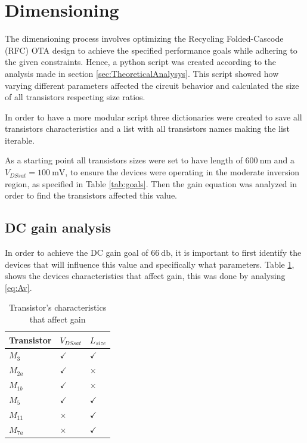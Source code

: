 \section{Dimensioning}

The dimensioning process involves optimizing the Recycling Folded-Cascode (RFC) OTA design to achieve the specified performance goals while adhering to the given constraints. Hence, a python script was created according to the analysis made in section \ref{sec:TheoreticalAnalysys}. This script showed how varying different parameters affected the circuit behavior and calculated the size of all transistors respecting size ratios. 

In order to have a more modular script three dictionaries were created to save all transistors characteristics and a list with all transistors names making the list iterable.

As a starting point all transistors sizes were set to have length of $\SI{600}{\nano\meter}$ and a $V_{DSsat} = \SI{100}{\milli\volt}$, to ensure the devices were operating in the moderate inversion region, as specified in Table \ref{tab:goals}. Then the gain equation was analyzed in order to find the transistors affected this value.

\subsection{DC gain analysis}
\label{sec:DCGain}
In order to achieve the DC gain goal of $\SI{66}{\decibel}$, it is important to first identify the devices that will influence this value and specifically what parameters. Table \ref{tab:GainTransistors}, shows the devices characteristics that affect gain, this was done by analysing \ref{eq:Av}.

\begin{table}[H]
    \centering
    \caption{Transistor's characteristics that affect gain}
    \begin{tabularx}{\textwidth}{>{\centering\arraybackslash}X >{\centering\arraybackslash}X >{\centering\arraybackslash}X}
        \toprule
        \textbf{Transistor} & \textbf{$V_{DSsat}$} & \textbf{$L_{size}$} \\
        \midrule
        $M_{3}$ & $\checkmark$ & $\checkmark$\\
        \midrule
        $M_{2a}$ & $\checkmark$ & $\times$\\
        \midrule
        $M_{1b}$ & $\checkmark$ & $\times$\\
        \midrule
        $M_{5}$ & $\checkmark$ & $\checkmark$\\
        \midrule
        $M_{11}$ & $\times$ & $\checkmark$\\
        \midrule
        $M_{7a}$ & $\times$ & $\checkmark$\\
        \bottomrule
    \end{tabularx}
    \label{tab:GainTransistors}
\end{table}

